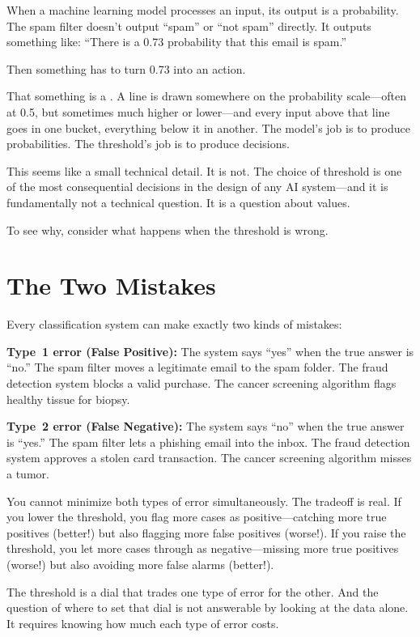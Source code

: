 When a machine learning model processes an input, its output is a probability. The spam filter doesn't output ``spam'' or ``not spam'' directly. It outputs something like: ``There is a 0.73 probability that this email is spam.''

Then something has to turn 0.73 into an action.

That something is a . A line is drawn somewhere on the probability scale---often at 0.5, but sometimes much higher or lower---and every input above that line goes in one bucket, everything below it in another. The model's job is to produce probabilities. The threshold's job is to produce decisions.

This seems like a small technical detail. It is not. The choice of threshold is one of the most consequential decisions in the design of any AI system---and it is fundamentally not a technical question. It is a question about values.

To see why, consider what happens when the threshold is wrong.

\section{The Two Mistakes}

Every classification system can make exactly two kinds of mistakes:

\textbf{Type~1 error (False Positive):} The system says ``yes'' when the true answer is ``no.'' The spam filter moves a legitimate email to the spam folder. The fraud detection system blocks a valid purchase. The cancer screening algorithm flags healthy tissue for biopsy.

\textbf{Type~2 error (False Negative):} The system says ``no'' when the true answer is ``yes.'' The spam filter lets a phishing email into the inbox. The fraud detection system approves a stolen card transaction. The cancer screening algorithm misses a tumor.

\begin{keyconcept}
You cannot minimize both types of error simultaneously. The tradeoff is real. If you lower the threshold, you flag more cases as positive---catching more true positives (better!) but also flagging more false positives (worse!). If you raise the threshold, you let more cases through as negative---missing more true positives (worse!) but also avoiding more false alarms (better!).

The threshold is a dial that trades one type of error for the other. And the question of where to set that dial is not answerable by looking at the data alone. It requires knowing how much each type of error costs.
\end{keyconcept}

